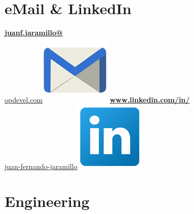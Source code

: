 \begin{aside}
    \section{eMail \& LinkedIn}
    \href{mailto:juanf.jaramillo@opdevel.com}{\small{\textbf{juanf.jaramillo@}\\opdevel.com}\includegraphics[scale=0.07]{img/email2.png}}
    \href{http:\\https://www.linkedin.com/in/juan-fernando-jaramillo/}{\textbf{www.linkedin.com/in/}\small{\\juan-fernando-jaramillo}\includegraphics[scale=0.07]{img/Linkedin.png}}
   ~
   ~
   ~
   ~
   ~
   ~
   ~
   ~
   ~
  \section{Engineering}
   ~
\end{aside}
